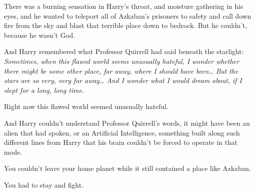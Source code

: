There was a burning sensation in Harry's throat, and moisture gathering in his 
eyes, and he wanted to teleport all of Azkaban's prisoners to safety and call 
down fire from the sky and blast that terrible place down to bedrock. But he 
couldn't, because he wasn't God.

And Harry remembered what Professor Quirrell had said beneath the starlight: 
\emph{Sometimes, when this flawed world seems unusually hateful, I wonder 
whether there might be some other place, far away, where I should have 
been{\ldots} But the stars are so very, very far away{\ldots} And I wonder what 
I would dream about, if I slept for a long, long time.}

Right now this flawed world seemed unusually hateful.

And Harry couldn't understand Professor Quirrell's words, it might have been an 
alien that had spoken, or an Artificial Intelligence, something built along 
such different lines from Harry that his brain couldn't be forced to operate in 
that mode.

You couldn't leave your home planet while it still contained a place like 
Azkaban.

You had to stay and fight.
